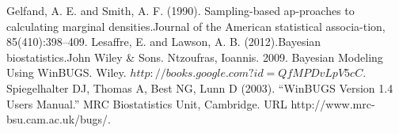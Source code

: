 \documentclass[11pt]{article}
\begin{document}
\begin{thebibliography}{}
 Gelfand,  A.  E.  and  Smith,  A.  F.  (1990).  Sampling-based ap-proaches to calculating marginal densities.Journal of the American statistical associa-tion, 85(410):398–409.
 Lesaffre, E. and Lawson, A. B. (2012).Bayesian biostatistics.John Wiley & Sons.
Ntzoufras, Ioannis. 2009. Bayesian Modeling Using WinBUGS. Wiley.
$http://books.google.com?id=QfMPDvLpV5cC.$
Spiegelhalter DJ, Thomas A, Best NG, Lunn D (2003). “WinBUGS Version 1.4 Users Manual.”
MRC Biostatistics Unit, Cambridge. URL http://www.mrc-bsu.cam.ac.uk/bugs/.

\end{thebibliography}
\end{document}
